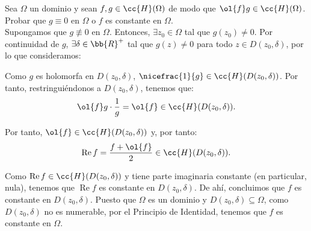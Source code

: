 \documentclass[12pt]{article}
\renewcommand{\Re}{\operatorname{Re}} %
\begin{document}
    \begin{ejercicio}[2.5 puntos]
        Sea $\Omega$ un dominio y sean $f, g \in \cc{H}(\Omega)$ de modo que $\ol{f}g\in \cc{H}(\Omega)$.
        Probar que $g \equiv 0$ en $\Omega$ o $f$ es constante en $\Omega$.\\

        Supongamos que $g \not\equiv 0$ en $\Omega$. Entonces, $\exists z_0 \in \Omega$ tal que $g(z_0) \neq 0$. Por continuidad de $g$, $\exists\delta\in \bb{R}^+$ tal que $g(z) \neq 0$ para todo $z \in D(z_0, \delta)$, por lo que consideramos:

        Como $g$ es holomorfa en $D(z_0, \delta)$, $\nicefrac{1}{g}\in \cc{H}(D(z_0, \delta))$. Por tanto, restringuiéndonos a $D(z_0, \delta)$, tenemos que:
        \begin{equation*}
            \ol{f}g\cdot \frac{1}{g} = \ol{f} \in \cc{H}(D(z_0, \delta)).
        \end{equation*}

        Por tanto, $\ol{f}\in \cc{H}(D(z_0, \delta))$ y, por tanto:
        \begin{equation*}
            \Re f = \dfrac{f + \ol{f}}{2} \in \cc{H}(D(z_0, \delta)).
        \end{equation*}

        Como $\Re f\in \cc{H}(D(z_0, \delta))$ y tiene parte imaginaria constante (en particular, nula), tenemos que $\Re f$ es constante en $D(z_0, \delta)$. De ahí, concluimos que $f$ es constante en $D(z_0, \delta)$. Puesto que $\Omega$ es un dominio y $D(z_0, \delta) \subseteq \Omega$, como $D(z_0, \delta)$ no es numerable, por el Principio de Identidad, tenemos que $f$ es constante en $\Omega$.


    \end{ejercicio}
\end{document}
